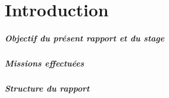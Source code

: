 \chapter{Introduction}
\paragraph{Objectif du présent rapport et du stage}
\paragraph{Missions effectuées}
\paragraph{Structure du rapport}
